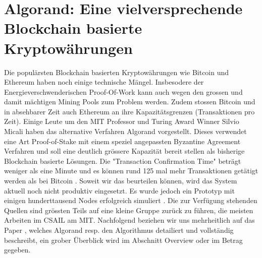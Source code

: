 \documentclass[11pt,a4paper]{article}
\author{Heinz Hofmann und Jonas Schmid}
\begin{document}
\section*{ \center \textbf{\Large Algorand: Eine vielversprechende Blockchain basierte Kryptow\"ahrungen}}

Die popul\"arsten Blockchain basierten Kryptow\"ahrungen wie Bitcoin und Ethereum haben noch einige technische M\"angel.
Insbesodere der Energieverschwenderischen Proof-Of-Work kann auch wegen den grossen 
und damit m\"achtigen Mining Pools zum Problem werden.
Zudem stossen Bitcoin und in absehbarer Zeit auch Ethereum an ihre Kapazit\"atsgrenzen (Transaktionen pro Zeit).
Einige Leute um den MIT Professor und Turing Award Winner Silvio Micali haben das alternative Verfahren Algorand vorgestellt.
Dieses verwendet eine Art Proof-of-Stake mit einem speziel angepassten Byzantine Agreement Verfahren und soll eine deutlich gr\"ossere Kapazit\"at bereit stellen als bisherige Blockchain basierte L\"osungen.
Die "Transaction Confirmation Time" betr\"agt weniger als eine Minute und es k\"onnen rund 125 mal mehr Transaktionen get\"atigt werden als bei Bitcoin \cite[Introduction]{Gilad:2017:ASB:3132747.3132757}.
Soweit wir das beurteilen k\"onnen, wird das System aktuell noch nicht produktiv eingesetzt.
Es wurde jedoch ein Prototyp mit einigen hunderttausend Nodes erfolgreich simuliert \cite[Kapitel Implementation \& Evaluation]{Gilad:2017:ASB:3132747.3132757}.
Die zur Verf\"ugung stehenden Quellen sind gr\"ossten Teils auf eine kleine Gruppe zur\"uck zu f\"uhren,
die meisten Arbeiten im CSAIL am MIT. %
Nachfolgend beziehen wir uns mehrheitlich auf das Paper \cite{Gilad:2017:ASB:3132747.3132757}, welches Algorand resp. den Algorithmus detailiert und vollst\"andig beschreibt, ein grober \"Uberblick wird im Abschnitt Overview oder im Betrag \cite{ScalingConsensus} gegeben.
\end{document}
